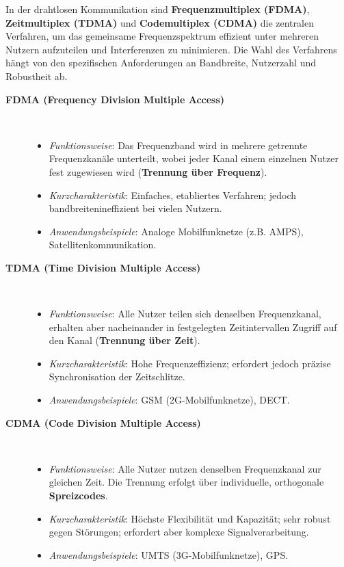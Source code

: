 \begin{ohmchapter}
In der drahtlosen Kommunikation sind \textbf{Frequenzmultiplex (FDMA)}, \textbf{Zeitmultiplex (TDMA)} und \textbf{Codemultiplex (CDMA)} die zentralen Verfahren, um das gemeinsame Frequenzspektrum effizient unter mehreren Nutzern aufzuteilen und Interferenzen zu minimieren. Die Wahl des Verfahrens hängt von den spezifischen Anforderungen an Bandbreite, Nutzerzahl und Robustheit ab.

\begin{description} 
    \item[\textbf{FDMA (Frequency Division Multiple Access)}]
     \ \\
    \begin{itemize}
        \item  \textit{Funktionsweise}: Das Frequenzband wird in mehrere getrennte Frequenzkanäle unterteilt, wobei jeder Kanal einem einzelnen Nutzer fest zugewiesen wird (\textbf{Trennung über Frequenz}).
        \item \textit{Kurzcharakteristik}: Einfaches, etabliertes Verfahren; jedoch bandbreitenineffizient bei vielen Nutzern.
        \item \textit{Anwendungsbeispiele}: Analoge Mobilfunknetze (z.B. AMPS), Satellitenkommunikation.
    \end{itemize}

    \item[\textbf{TDMA (Time Division Multiple Access)}]
    \ \\
    \begin{itemize}
        \item \textit{Funktionsweise}: Alle Nutzer teilen sich denselben Frequenzkanal, erhalten aber nacheinander in festgelegten Zeitintervallen Zugriff auf den Kanal (\textbf{Trennung über Zeit}).
        \item \textit{Kurzcharakteristik}: Hohe Frequenzeffizienz; erfordert jedoch präzise Synchronisation der Zeitschlitze.
        \item \textit{Anwendungsbeispiele}: GSM (2G-Mobilfunknetze), DECT.
    \end{itemize}

    \item[\textbf{CDMA (Code Division Multiple Access)}]
    \ \\
    \begin{itemize}
        \item \textit{Funktionsweise}: Alle Nutzer nutzen denselben Frequenzkanal zur gleichen Zeit. Die Trennung erfolgt über individuelle, orthogonale \textbf{Spreizcodes}.
        \item \textit{Kurzcharakteristik}: Höchste Flexibilität und Kapazität; sehr robust gegen Störungen; erfordert aber komplexe Signalverarbeitung.
        \item \textit{Anwendungsbeispiele}: UMTS (3G-Mobilfunknetze), GPS.
    \end{itemize}
\end{description}



\end{ohmchapter}
